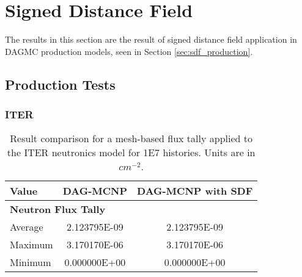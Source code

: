   
  \section{Signed Distance Field}

  The results in this section are the result of signed distance field
  application in DAGMC production models, seen in Section
  \ref{sec:sdf_production}. 
  
\subsection{Production Tests}

\subsubsection{ITER}

\begin{table}[H]
  \small
  \begin{center}
    \begin{tabular}{lcc}
          \toprule
          Value   & DAG-MCNP     & DAG-MCNP with SDF      \\
          \toprule
          \multicolumn{3}{l}{\textbf{Neutron Flux Tally}} \\
          Average & 2.123795E-09 & 2.123795E-09           \\
          Maximum & 3.170170E-06 & 3.170170E-06           \\
          Minimum & 0.000000E+00 & 0.000000E+00           \\
          \bottomrule
    \end{tabular}
  \end{center}
  \caption[Flux tally results in the ITER model for various DAG-MCNP
    implementations.]{Result comparison for a mesh-based flux tally applied to
    the ITER neutronics model for \num{1E7} histories. Units are in $cm^{-2}$.}
\end{table}


